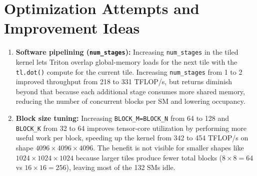 \documentclass[11pt]{article}
\begin{document}
\section*{Optimization Attempts and Improvement Ideas}

\begin{enumerate}

\item \textbf{Software pipelining (\texttt{num\_stages}):} Increasing \texttt{num\_stages}
in the tiled kernel lets Triton overlap global-memory loads for the next tile with the
\texttt{tl.dot()} compute for the current tile. Increasing \texttt{num\_stages} from 1 to
2 improved throughput from 218 to 331 TFLOP/s, but returns diminish beyond that because
each additional stage consumes more shared memory, reducing the number of concurrent blocks
per SM and lowering occupancy.

\item \textbf{Block size tuning:} Increasing \texttt{BLOCK\_M=BLOCK\_N} from 64 to 128
and \texttt{BLOCK\_K} from 32 to 64 improves tensor-core utilization by performing more
useful work per block, speeding up the kernel from 342 to 454 TFLOP/s on shape
$4096\times4096\times4096$. The benefit is not visible for smaller shapes like
$1024\times1024\times1024$ because larger tiles produce fewer total blocks
($8\times8=64$ vs $16\times16=256$), leaving most of the 132 SMs idle.

\end{enumerate}
\end{document}
